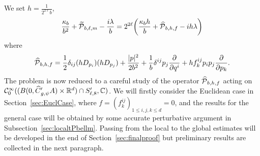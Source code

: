 \documentclass[10pt]{amsart}
\theoremstyle{definition}\newtheorem{defi}[theo]{Definition}\newtheorem{rema}[theo]{Remark}\newtheorem{exam}[theo]{Example}\newtheorem{exem}[theo]{Example}\newtheorem{nota}[theo]{Notation}
\newcommand{\C}{\mathbb{C}}
\newcommand{\R}{\mathbb{R}}
\newcommand{\clC}{\mathcal{C}}
\newcommand{\clP}{\mathcal{P}}
\let\oldtilde\tilde
\renewcommand*{\tilde}[1]{\mathchoice{\widetilde{#1}}{\widetilde{#1}}{\oldtilde{#1}}{\oldtilde{#1}}}
\let\oldhat\hat
\renewcommand*{\hat}[1]{\mathchoice{\widehat{#1}}{\widehat{#1}}{\oldhat{#1}}{\oldhat{#1}}}
\let\originalleft\left
\let\originalright\right
\renewcommand{\left}{\mathopen{}\mathclose\bgroup\originalleft}
\renewcommand{\right}{\aftergroup\egroup\originalright}
\begin{document}
We set $h=\frac{1}{2^{2\ell}b}$,
\begin{equation}
\frac{\kappa_{b}}{b^{2}} + \tilde{\clP}_{b,\ell,m} - \frac{i\lambda}{b}= 2^{2\ell}
\left(
\frac{\kappa_{b}h}{b} + \hat{\clP}_{b,h,f} - i h \lambda
\right)
\end{equation}
where
\begin{equation}\label{perturbation_of_Euclidean_KFP}
\hat{\clP}_{b,h,f} = \frac{1}{2}\delta_{ij}(hD_{p_{i}})(hD_{p_{j}}) + \frac{|p|^2}{2b^2} + \frac{1}{b}\delta^{ij}p_{j}\frac{\partial}{\partial q^{i}} + hf^{ij}_{k} p_{i}p_{j}\frac{\partial}{\partial p_{k}}.
\end{equation}
The problem is now reduced to a careful study of the operator $\hat{ \clP}_{b,h,f}$ acting on $\clC^\infty_0((B(0,\hat{C}'_{g,\psi}A)\times \R^d)\cap S_{\ell,8}',\C)$. We will firstly consider the Euclidean case in Section~\ref{sec:EuclCase}, where $f=(f^{ij}_k)_{1\leq i,j,k \leq d}=0$, and the results for the general case will be obtained by some accurate perturbative argument in Subsection~\ref{sec:localtPbellm}. Passing from the local to the global estimates will be developed in the end of Section~\ref{sec:finalproof} but preliminary results are collected in the next paragraph.
\end{document}
